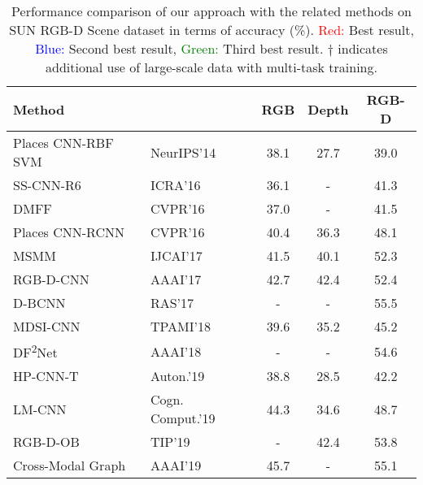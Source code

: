 \begin{table}[!t]
	\caption{Performance comparison of our approach with the related methods on SUN RGB-D Scene dataset in terms of accuracy (\%). \textcolor{red}{Red:} Best result, \textcolor{blue}{Blue:} Second best result, \textcolor{green}{Green:} Third best result. $\dagger$ indicates additional use of large-scale data with multi-task training.}
	\begin{center}
		\setlength{\tabcolsep}{0.9em} %
		\def\arraystretch{1.2}
		\begin{adjustbox}{width=\columnwidth}
			\begin{tabular}{ llccc }
				\hline
				Method 												&					& RGB 				& Depth 			& RGB-D \\ \hline \hline
				Places CNN-RBF SVM \citep{2014_NIPS_Zhou}    		& NeurIPS'14 		& 38.1 				& 27.7 	 			& 39.0 		\\
				SS-CNN-R6 \citep{2016_ICRA_Liao}    				& ICRA'16			& 36.1 				& - 	 			& 41.3 		\\ 
				DMFF \citep{2016_CVPR_Zhu}    						& CVPR'16			& 37.0  			& - 				& 41.5 		\\ 
				Places CNN-RCNN \citep{2016_CVPR_Wang}         		& CVPR'16			& 40.4 	           	& 36.3 	        	& 48.1 		\\ 
				MSMM \citep{2017_IJCAI_Song}         				& IJCAI'17			& 41.5 	           	& 40.1 	        	& 52.3 		\\ 
				RGB-D-CNN \citep{2017_AAAI_Song}         			& AAAI'17			& 42.7 	           	& 42.4 	        	& 52.4 		\\ 
				D-BCNN \citep{2017_RAS_Zaki}         				& RAS'17			& - 	           	& - 	        	& 55.5 		\\ 
				MDSI-CNN \citep{2018_TPAMI_Asif}         			& TPAMI'18			& 39.6 	           	& 35.2 	        	& 45.2 		\\ 
				DF\textsuperscript{2}Net \citep{2018_AAAI_Li} 		& AAAI'18			& - 	           	& - 	        	& 54.6 		\\ 
				HP-CNN-T \citep{2019_AuotRob_Zaki}         			& Auton.'19			& 38.8 	           	& 28.5 	        	& 42.2 		\\ 
				LM-CNN \citep{2019_CogComp_Cai}         			& Cogn. Comput.'19	& 44.3 	           	& 34.6 	        	& 48.7 		\\ 
				RGB-D-OB \citep{2019_TIP_Song}         				& TIP'19			& - 	           	& 42.4 	        	& 53.8 		\\ 
				Cross-Modal Graph \citep{2019_AAAI_Yuan}        	& AAAI'19			& 45.7 	           	& - 	        	& 55.1		\\

\end{tabular}
\end{adjustbox}
\end{center}
\end{table}
